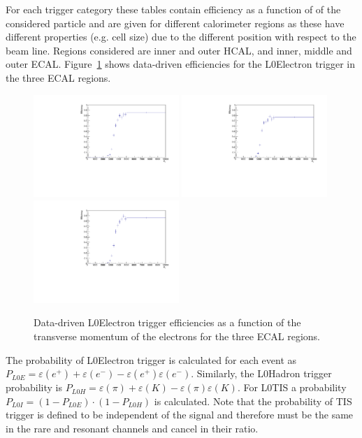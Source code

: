 For each trigger category these tables contain efficiency as a function of
\pt of the considered particle and are given for different calorimeter regions
as these have different properties (e.g. cell size) due to the different position
with respect to the beam line. Regions considered are inner and outer HCAL, 
and inner, middle and outer ECAL. Figure~\ref{sec:L0eff_tables} shows data-driven 
efficiencies for the L0Electron trigger in the three ECAL regions.
%
\begin{figure}[h!]
\centering
\includegraphics[width=0.49\textwidth]{RKst/figs/l0plots/l0E_Inner.pdf}
\includegraphics[width=0.49\textwidth]{RKst/figs/l0plots/l0E_Middle.pdf}
\includegraphics[width=0.49\textwidth]{RKst/figs/l0plots/l0E_Outer.pdf}
\caption{Data-driven L0Electron trigger efficiencies as a function of the transverse momentum
of the electrons for the three ECAL regions.}
\label{sec:L0eff_tables}
\end{figure}

The probability of L0Electron trigger is calculated for each event as $P_{L0E} = \varepsilon(e^+) + \varepsilon(e^-) - \varepsilon(e^+)\varepsilon(e^-)$.
Similarly, the L0Hadron trigger probability is $P_{L0H} = \varepsilon(\pi) + \varepsilon(K) - \varepsilon(\pi)\varepsilon(K)$.
For L0TIS a probability $P_{L0I} = (1-P_{L0E})\cdot(1-P_{L0H})$ is calculated.
Note that the probability of TIS trigger is defined to be independent of the signal and therefore must
be the same in the rare and resonant channels and cancel in their ratio.

